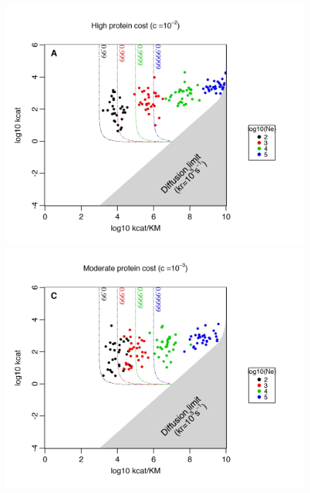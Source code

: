 \begin{figure}[!p]
\begin{center}
\vspace{-0.75cm}
\begin{minipage}[c]{0.6\textwidth}
\begin{center}
    \includegraphics[scale=0.52,trim=0cm 0cm 0cm 0cm,clip]{pics/SM-Enzymes/Evo_Results_CostCrow_H.jpeg}
    \includegraphics[scale=0.52,trim=0cm 0cm 0cm 0cm,clip]{pics/SM-Enzymes/Evo_Results_CostCrow_M.jpeg}

\end{center}
\end{minipage}
\end{center}
\end{figure}
